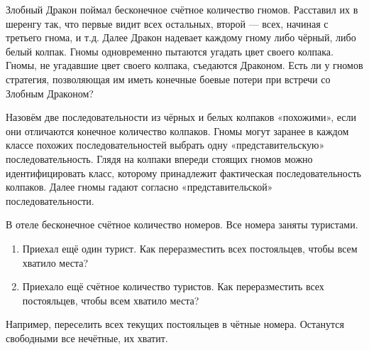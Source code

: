 \begin{problem}
Злобный Дракон поймал бесконечное счётное количество гномов. Расставил их в шеренгу так, что первые видит всех остальных, второй — всех, начиная с третьего гнома, и т.д. Далее Дракон надевает каждому гному либо чёрный, либо белый колпак. Гномы одновременно пытаются угадать цвет своего колпака. Гномы, не угадавшие цвет своего колпака, съедаются Драконом. Есть ли у гномов стратегия, позволяющая им иметь конечные боевые потери при встречи со Злобным Драконом?

\begin{sol}
Назовём две последовательности из чёрных и белых колпаков «похожими», если они отличаются конечное количество колпаков. Гномы могут заранее в каждом классе похожих последовательностей выбрать одну «представительскую» последовательность. Глядя на колпаки впереди стоящих гномов можно идентифицировать класс, которому принадлежит фактическая последовательность колпаков. Далее гномы гадают согласно «представительской» последовательности.
\end{sol}
\end{problem}


\begin{problem}
В отеле бесконечное счётное количество номеров. Все номера заняты туристами.
\begin{enumerate}
\item Приехал ещё один турист. Как переразместить всех постояльцев, чтобы всем хватило места?
\item Приехало ещё счётное количество туристов. Как переразместить всех постояльцев, чтобы всем хватило места?
\end{enumerate}

\begin{sol}
Например, переселить всех текущих постояльцев в чётные номера. Останутся свободными все нечётные, их хватит.
\end{sol}
\end{problem}


